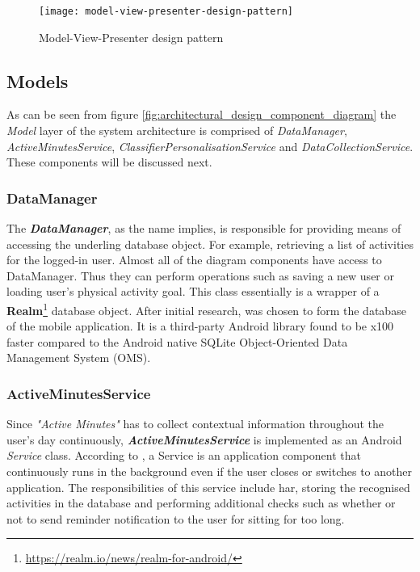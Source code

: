     \begin{figure}[ht]
        \centering
        \texttt{[image: model-view-presenter-design-pattern]}
        \caption{Model-View-Presenter design pattern \citep[28]{syromiatnikov2014}}
        \label{fig:model_view_presenter_design_pattern}
    \end{figure}
        
        \subsection{Models}
        As can be seen from figure \ref{fig:architectural_design_component_diagram} the \textit{Model} layer of the system architecture is comprised of \textit{DataManager}, \textit{ActiveMinutesService}, \textit{ClassifierPersonalisationService} and \textit{DataCollectionService}. These components will be discussed next.
        
            \subsubsection{DataManager}
            \label{section:data-manager}
            The \textbf{\textit{DataManager}}, as the name implies, is responsible for providing means of accessing the underling database object. For example, retrieving a list of activities for the logged-in user. Almost all of the diagram components have access to DataManager. Thus they can perform operations such as saving a new user or loading user's physical activity goal. This class essentially is a wrapper of a \textbf{Realm}\footnote{\url{https://realm.io/news/realm-for-android/}} database object. After initial research, \citet{realm2014} was chosen to form the database of the mobile application. It is a third-party Android library found to be x100 faster compared to the Android native SQLite Object-Oriented Data Management System (OMS).
            
            \subsubsection{ActiveMinutesService}
            \label{section:active-minutes-service}
            Since \textit{"Active Minutes"} has to collect contextual information throughout the user's day continuously, \textbf{\textit{ActiveMinutesService}} is implemented as an Android \textit{Service} class. According to \citet{googleservices2017}, a Service is an application component that continuously runs in the background even if the user closes or switches to another application. The responsibilities of this service include \gls{har}, storing the recognised activities in the database and performing additional checks such as whether or not to send reminder notification to the user for sitting for too long.
            
